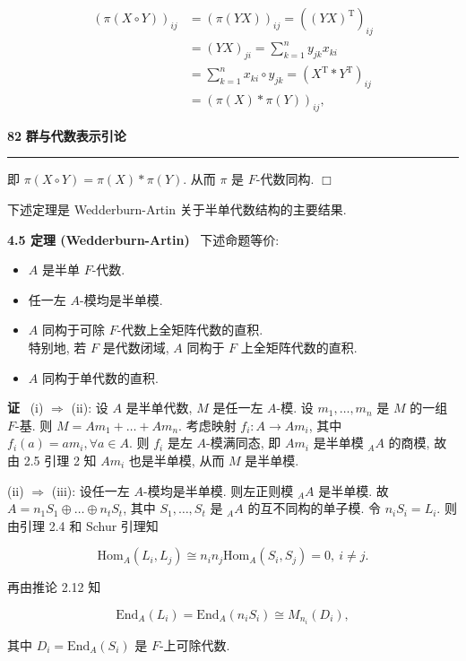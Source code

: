 \documentclass[11pt,a4paper]{article}
\begin{document}
$$
\begin{aligned}
(\pi(X \circ Y))_{ij} &= (\pi(YX))_{ij} = ((YX)^{\mathrm{T}})_{ij} \\
&= (YX)_{ji} = \sum_{k=1}^n y_{jk} x_{ki} \\
&= \sum_{k=1}^n x_{ki} \circ y_{jk} = (X^{\mathrm{T}} * Y^{\mathrm{T}})_{ij} \\
&= (\pi(X) * \pi(Y))_{ij},
\end{aligned}
$$

\newpage
\noindent \textbf{82} \hfill \textbf{群与代数表示引论}
\vspace{0.5em} \hrule \vspace{1.5em}

即 $\pi(X \circ Y) = \pi(X) * \pi(Y)$. 从而 $\pi$ 是 $F$-代数同构. \hfill $\Box$

下述定理是 Wedderburn-Artin 关于半单代数结构的主要结果.

\textbf{4.5 定理 (Wedderburn-Artin)} \ 下述命题等价:
\begin{itemize}
    \item[(i)] $A$ 是半单 $F$-代数.
    \item[(ii)] 任一左 $A$-模均是半单模.
    \item[(iii)] $A$ 同构于可除 $F$-代数上全矩阵代数的直积. \\
    特别地, 若 $F$ 是代数闭域, $A$ 同构于 $F$ 上全矩阵代数的直积.
    \item[(iv)] $A$ 同构于单代数的直积.
\end{itemize}

\textbf{证} \ (i) $\Rightarrow$ (ii): 设 $A$ 是半单代数, $M$ 是任一左 $A$-模. 设 $m_1, \dots, m_n$ 是 $M$ 的一组 $F$-基. 则 $M = Am_1 + \dots + Am_n$. 考虑映射 $f_i: A \to Am_i$, 其中 $f_i(a) = am_i, \forall a \in A$. 则 $f_i$ 是左 $A$-模满同态, 即 $Am_i$ 是半单模 ${}_A A$ 的商模, 故由 2.5 引理 2 知 $Am_i$ 也是半单模, 从而 $M$ 是半单模.

(ii) $\Rightarrow$ (iii): 设任一左 $A$-模均是半单模. 则左正则模 ${}_A A$ 是半单模. 故 $A = n_1S_1 \oplus \dots \oplus n_tS_t$, 其中 $S_1, \dots, S_t$ 是 ${}_A A$ 的互不同构的单子模. 令 $n_iS_i = L_i$. 则由引理 2.4 和 Schur 引理知

$$
\mathrm{Hom}_A(L_i, L_j) \cong n_i n_j \mathrm{Hom}_A(S_i, S_j) = 0, \ i \neq j.
$$

再由推论 2.12 知

$$
\mathrm{End}_A(L_i) = \mathrm{End}_A(n_iS_i) \cong M_{n_i}(D_i),
$$

其中 $D_i = \mathrm{End}_A(S_i)$ 是 $F$-上可除代数.
\end{document}
